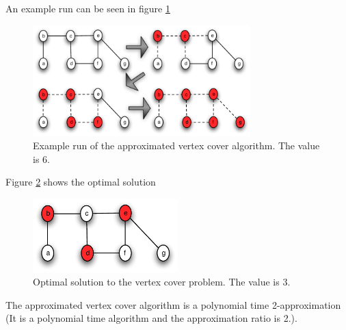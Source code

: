 \documentclass[10pt]{article}
\begin{document}
An example run can be seen in figure \ref{fig12}

\begin{figure}[ht]
\centering
\includegraphics[width=0.75\textwidth]{figures/fig12.pdf}
\caption{Example run of the approximated vertex cover algorithm. The value is 6.}
\label{fig12}
\end{figure}

Figure \ref{fig13} shows the optimal solution
\begin{figure}[ht]
\centering
\includegraphics[width=0.5\textwidth]{figures/fig13.pdf}
\caption{Optimal solution to the vertex cover problem. The value is 3.}
\label{fig13}
\end{figure}

The approximated vertex cover algorithm is a polynomial time 2-approximation (It is a polynomial time algorithm and the approximation ratio is 2.).
\end{document}

